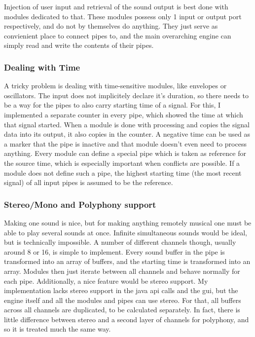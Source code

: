 \documentclass[11pt,a4paper]{article}
\begin{document}
Injection of user input and retrieval of the sound output is best done with modules dedicated to that. These modules possess only 1 input or output port respectively, and do not by themselves do anything. They just serve as convienient place to connect pipes to, and the main overarching engine can simply read and write the contents of their pipes.

\subsubsection{Dealing with Time}

A tricky problem is dealing with time-sensitive modules, like envelopes or oscillators. The input does not implicitely declare it's duration, so there needs to be a way for the pipes to also carry starting time of a signal. For this, I implemented a separate counter in every pipe, which showed the time at which that signal started. When a module is done with processing and copies the signal data into its output, it also copies in the counter. A negative time can be used as a marker that the pipe is inactive and that module doesn't even need to process anything. Every module can define a special pipe which is taken as reference for the source time, which is especially important when conflicts are possible. If a module does not define such a pipe, the highest starting time (the most recent signal) of all input pipes is assumed to be the reference.

\subsubsection{Stereo/Mono and Polyphony support}

Making one sound is nice, but for making anything remotely musical one must be able to play several sounds at once. Infinite simultaneous sounds would be ideal, but is technically impossible. A number of different channels though, usually around 8 or 16, is simple to implement. Every sound buffer in the pipe is transformed into an array of buffers, and the starting time is transformed into an array. Modules then just iterate between all channels and behave normally for each pipe.
Additionally, a nice feature would be stereo support. My implementation lacks stereo support in the java api calls and the gui, but the engine itself and all the modules and pipes can use stereo. For that, all buffers across all channels are duplicated, to be calculated separately. In fact, there is little difference between stereo and a second layer of channels for polyphony, and so it is treated much the same way.
\end{document}
